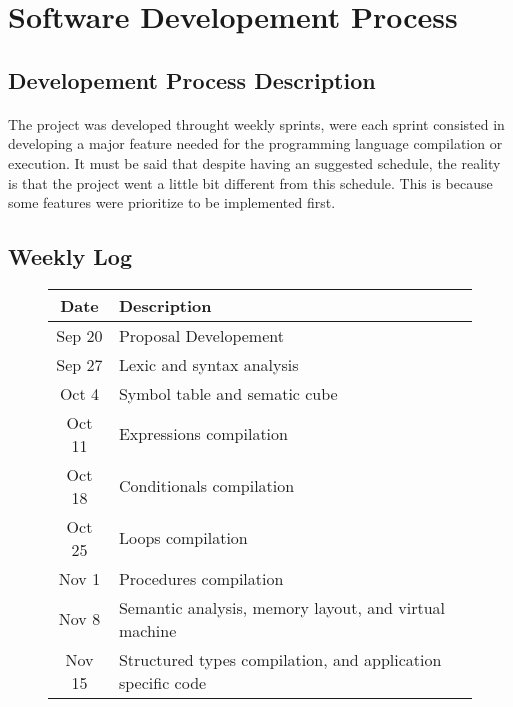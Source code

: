 \section{Software Developement Process}

\subsection{Developement Process Description}
\paragraph{} The project was developed throught weekly sprints, were each
sprint consisted in developing a major feature needed for the programming
language compilation or execution. It must be said that despite having an
suggested schedule, the reality is that the project went a little bit different
from this schedule. This is because some features were prioritize to be
implemented first.

\subsection{Weekly Log}

\begin{figure}[h]
    \centering
    \begin{tabular}{cp{3.5in}}
        \toprule
        \textbf{Date} & \textbf{Description}\\
        \midrule Sep 20 &
        Proposal Developement\\

        \midrule Sep 27 &
        Lexic and syntax analysis\\

        \midrule Oct  4 &
        Symbol table and sematic cube\\

        \midrule Oct 11 &
        Expressions compilation\\

        \midrule Oct 18 &
        Conditionals compilation\\

        \midrule Oct 25 &
        Loops compilation\\

        \midrule Nov  1 &
        Procedures compilation\\

        \midrule Nov  8 &
        Semantic analysis, memory layout, and virtual machine\\

        \midrule Nov 15 &
        Structured types compilation, and application specific code\\

        \bottomrule
    \end{tabular}
\end{figure}

